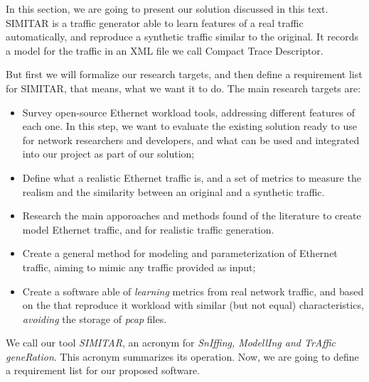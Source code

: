In this section, we are going to present our solution discussed in this text. SIMITAR is a traffic generator able to learn features of a real traffic automatically, and reproduce a synthetic traffic similar to the original. It records a model for the traffic in an XML file we call Compact Trace Descriptor. 

But first we will formalize our research targets, and then define a requirement list for SIMITAR, that means, what we want it to do. The main research targets are:

\begin{itemize}
	
	\item Survey open-source Ethernet workload tools, addressing different features of each one. In this step, we want to evaluate the existing solution ready to use for network researchers and developers, and what can be used and integrated into our project as part of our solution;
	
	\item Define what a realistic Ethernet traffic is, and a set of metrics to measure the realism and the similarity between an original and a synthetic traffic.
	
	\item Research the main apporoaches and methods found of the literature to create model Ethernet traffic, and for realistic traffic generation. 
	
	\item Create a general method for modeling and parameterization of Ethernet traffic, aiming to mimic any traffic provided as input;
	
	\item Create a software able of \textit{learning} metrics from real network traffic, and based on the that reproduce it workload with similar (but not equal) characteristics, \textit{avoiding} the storage of \textit{pcap} files.
	
\end{itemize}

We call our  tool \textit{SIMITAR}, an acronym for \textit{SnIffing, ModellIng and TrAffic geneRation}.  This acronym summarizes its operation. Now, we are going to define a requirement list for our proposed software.

